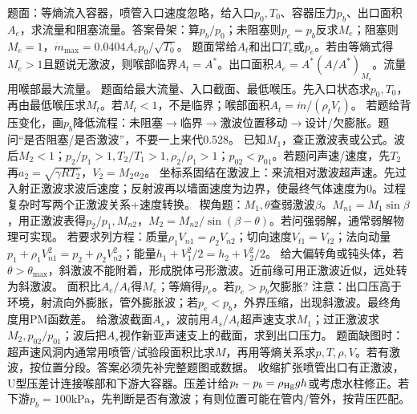 题面：等熵流入容器，喷管入口速度忽略，给入口$p_0,T_0$、容器压力$p_b$、出口面积$A_e$，求流量和阻塞流量。答案骨架：算$p_b/p_0$；未阻塞则$p_e=p_b$反求$M_e$；阻塞则$M_e=1$，$\dot m_{\max}=0.0404A_ep_0/\sqrt{T_0}$。
题面常给$A_t$和出口$T_e$或$p_e$。若由等熵式得$M_e>1$且题说无激波，则喉部临界$A_t=A^*$。出口面积$A_e=A^*(A/A^*)_{M_e}$。流量用喉部最大流量。
题面给最大流量、入口截面、最低喉压。先入口状态求$p_0,T_0$，再由最低喉压求$M_t$。若$M_t<1$，不是临界；喉部面积$A_t=\dot m/(\rho_tV_t)$。
若题给背压变化，画$p_b$降低流程：未阻塞$\to$临界$\to$激波位置移动$\to$设计/欠膨胀。题问“是否阻塞/是否激波”，不要一上来代0.528。
已知$M_1$，查正激波表或公式。波后$M_2<1$；$p_2/p_1>1,T_2/T_1>1,\rho_2/\rho_1>1$；$p_{02}<p_{01}$。若题问声速/速度，先$T_2$再$a_2=\sqrt{\gamma RT_2}$，$V_2=M_2a_2$。
坐标系固结在激波上：来流相对激波超声速。先过入射正激波求波后速度；反射波再以墙面速度为边界，使最终气体速度为0。过程复杂时写两个正激波关系+速度转换。
楔角题：$M_1,\theta$查弱激波$\beta$。$M_{n1}=M_1\sin\beta$，用正激波表得$p_2/p_1,M_{n2}$，$M_2=M_{n2}/\sin(\beta-\theta)$。若问强弱解，通常弱解物理可实现。
若要求列方程：质量$\rho_1V_{n1}=\rho_2V_{n2}$；切向速度$V_{t1}=V_{t2}$；法向动量$p_1+\rho_1V_{n1}^2=p_2+\rho_2V_{n2}^2$；能量$h_1+V_1^2/2=h_2+V_2^2/2$。
给大偏转角或钝头体，若$\theta>\theta_{\max}$，斜激波不能附着，形成脱体弓形激波。近前缘可用正激波近似，远处转为斜激波。
面积比$A_e/A_t$得$M_e$；等熵得$p_e$。若$p_e>p_b$欠膨胀? 注意：出口压高于环境，射流向外膨胀，管外膨胀波；若$p_e<p_b$，外界压缩，出现斜激波。最终角度用PM函数差。
给激波截面$A_s$，波前用$A_s/A_t$超声速支求$M_1$；过正激波求$M_2,p_{02}/p_{01}$；波后把$A_s$视作新亚声速支上的截面，求到出口压力。
题面缺图时：超声速风洞内通常用喷管/试验段面积比求$M$，再用等熵关系求$p,T,\rho,V$。若有激波，按位置分段。答案必须先补完整题图或数据。
收缩扩张喷管出口有正激波，U型压差计连接喉部和下游大容器。压差计给$p_t-p_b=\rho_{\rm Hg}gh$或考虑水柱修正。若下游$p_b=100$kPa，先判断是否有激波；有则位置可能在管内/管外，按背压匹配。

